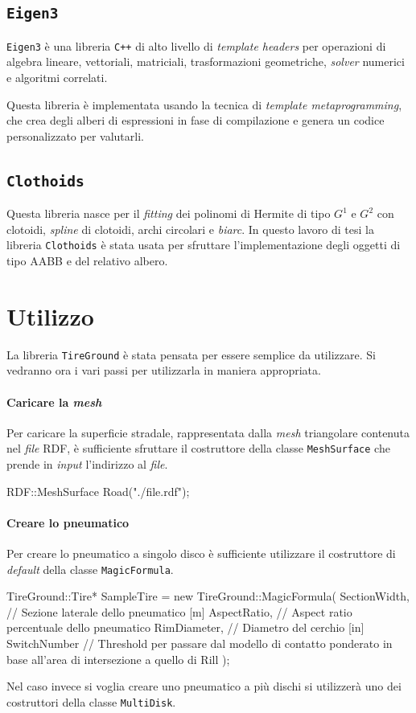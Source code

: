 \subsection{\texttt{Eigen3}}
\texttt{Eigen3} è una libreria \texttt{C++} di alto livello di \textit{template headers} per operazioni di algebra lineare, vettoriali, matriciali, trasformazioni geometriche, \textit{solver} numerici e algoritmi correlati.

Questa libreria è implementata usando la tecnica di \textit{template metaprogramming}, che crea degli alberi di espressioni in fase di compilazione e genera un codice personalizzato per valutarli.
%
\subsection{\texttt{Clothoids}}
Questa libreria nasce per il \textit{fitting} dei polinomi di Hermite di tipo $G^1$ e $G^2$ con clotoidi, \textit{spline} di clotoidi, archi circolari e \textit{biarc}. In questo lavoro di tesi la libreria \texttt{Clothoids} è stata usata per sfruttare l'implementazione degli oggetti di tipo \ac{AABB} e del relativo albero.
%
\section{Utilizzo}
La libreria \texttt{TireGround} è stata pensata per essere semplice da utilizzare. Si vedranno ora i vari passi per utilizzarla in maniera appropriata.
%
\paragraph{Caricare la \textit{mesh}}
Per caricare la superficie stradale, rappresentata dalla \textit{mesh} triangolare contenuta nel \textit{file} \ac{RDF}, è sufficiente sfruttare il costruttore della classe \texttt{MeshSurface} che prende in \textit{input} l'indirizzo al \textit{file}.
\begin{pseudoc}
	RDF::MeshSurface Road("./file.rdf");
\end{pseudoc}
%
\paragraph{Creare lo pneumatico}
Per creare lo pneumatico a singolo disco è sufficiente utilizzare il costruttore di \textit{default} della classe \texttt{MagicFormula}.
\begin{pseudoc}
	TireGround::Tire* SampleTire = new TireGround::MagicFormula(
		SectionWidth, // Sezione laterale dello pneumatico [m]
		AspectRatio,  // Aspect ratio percentuale dello pneumatico
		RimDiameter,  // Diametro del cerchio [in]
		SwitchNumber  // Threshold per passare dal modello di contatto ponderato in base all'area di intersezione a quello di Rill 
		);
\end{pseudoc}
Nel caso invece si voglia creare uno pneumatico a più dischi si utilizzerà uno dei costruttori della classe \texttt{MultiDisk}.

